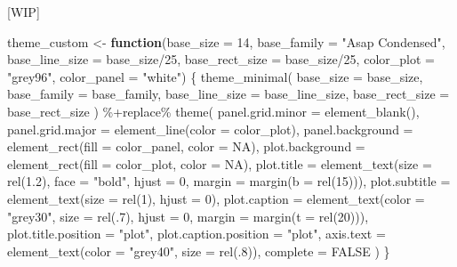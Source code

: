 \documentclass[
]{krantz}
\makeatletter
\newenvironment{Shaded}{\begin{snugshade}}{\end{snugshade}}
\newcommand{\AttributeTok}[1]{\textcolor[rgb]{0.61,0.61,0.61}{#1}}
\newcommand{\ConstantTok}[1]{\textcolor[rgb]{0,0,0}{#1}}
\newcommand{\ControlFlowTok}[1]{\textcolor[rgb]{0.27,0.27,0.27}{\textbf{#1}}}
\newcommand{\DecValTok}[1]{\textcolor[rgb]{0.06,0.06,0.06}{#1}}
\newcommand{\FloatTok}[1]{\textcolor[rgb]{0.06,0.06,0.06}{#1}}
\newcommand{\FunctionTok}[1]{\textcolor[rgb]{0,0,0}{#1}}
\newcommand{\NormalTok}[1]{#1}
\newcommand{\OtherTok}[1]{\textcolor[rgb]{0.37,0.37,0.37}{#1}}
\newcommand{\SpecialCharTok}[1]{\textcolor[rgb]{0,0,0}{#1}}
\newcommand{\StringTok}[1]{\textcolor[rgb]{0.5,0.5,0.5}{#1}}
\newenvironment{kframe}{%
\medskip{}
\setlength{\fboxsep}{.8em}
 \def\at@end@of@kframe{}%
 \ifinner\ifhmode%
  \def\at@end@of@kframe{\end{minipage}}%
  \begin{minipage}{\columnwidth}%
 \fi\fi%
 \def\FrameCommand##1{\hskip\@totalleftmargin \hskip-\fboxsep
 \colorbox{shadecolor}{##1}\hskip-\fboxsep
     \hskip-\linewidth \hskip-\@totalleftmargin \hskip\columnwidth}%
 \MakeFramed {\advance\hsize-\width
   \@totalleftmargin\z@ \linewidth\hsize
   \@setminipage}}%
 {\par\unskip\endMakeFramed%
 \at@end@of@kframe}
\renewenvironment{Shaded}{\begin{kframe}}{\end{kframe}}
\makeatother
\begin{document}
{[}WIP{]}

\begin{Shaded}
\begin{Highlighting}[]
\NormalTok{theme\_custom }\OtherTok{\textless{}{-}} \ControlFlowTok{function}\NormalTok{(}\AttributeTok{base\_size =} \DecValTok{14}\NormalTok{, }\AttributeTok{base\_family =} \StringTok{"Asap Condensed"}\NormalTok{, }
                         \AttributeTok{base\_line\_size =}\NormalTok{ base\_size}\SpecialCharTok{/}\DecValTok{25}\NormalTok{, }\AttributeTok{base\_rect\_size =}\NormalTok{ base\_size}\SpecialCharTok{/}\DecValTok{25}\NormalTok{,}
                         \AttributeTok{color\_plot =} \StringTok{"grey96"}\NormalTok{, }\AttributeTok{color\_panel =} \StringTok{"white"}\NormalTok{) \{}
    \FunctionTok{theme\_minimal}\NormalTok{(}
      \AttributeTok{base\_size =}\NormalTok{ base\_size, }\AttributeTok{base\_family =}\NormalTok{ base\_family, }
      \AttributeTok{base\_line\_size =}\NormalTok{ base\_line\_size, }\AttributeTok{base\_rect\_size =}\NormalTok{ base\_rect\_size}
\NormalTok{    ) }\SpecialCharTok{\%+replace\%} 
    \FunctionTok{theme}\NormalTok{(}
      \AttributeTok{panel.grid.minor =} \FunctionTok{element\_blank}\NormalTok{(),}
      \AttributeTok{panel.grid.major =} \FunctionTok{element\_line}\NormalTok{(}\AttributeTok{color =}\NormalTok{ color\_plot),}
      \AttributeTok{panel.background =} \FunctionTok{element\_rect}\NormalTok{(}\AttributeTok{fill =}\NormalTok{ color\_panel, }\AttributeTok{color =} \ConstantTok{NA}\NormalTok{),}
      \AttributeTok{plot.background =} \FunctionTok{element\_rect}\NormalTok{(}\AttributeTok{fill =}\NormalTok{ color\_plot, }\AttributeTok{color =} \ConstantTok{NA}\NormalTok{),}
      \AttributeTok{plot.title =} \FunctionTok{element\_text}\NormalTok{(}\AttributeTok{size =} \FunctionTok{rel}\NormalTok{(}\FloatTok{1.2}\NormalTok{), }\AttributeTok{face =} \StringTok{"bold"}\NormalTok{, }\AttributeTok{hjust =} \DecValTok{0}\NormalTok{,}
                                  \AttributeTok{margin =} \FunctionTok{margin}\NormalTok{(}\AttributeTok{b =} \FunctionTok{rel}\NormalTok{(}\DecValTok{15}\NormalTok{))), }
      \AttributeTok{plot.subtitle =} \FunctionTok{element\_text}\NormalTok{(}\AttributeTok{size =} \FunctionTok{rel}\NormalTok{(}\DecValTok{1}\NormalTok{), }\AttributeTok{hjust =} \DecValTok{0}\NormalTok{),}
      \AttributeTok{plot.caption =} \FunctionTok{element\_text}\NormalTok{(}\AttributeTok{color =} \StringTok{"grey30"}\NormalTok{, }\AttributeTok{size =} \FunctionTok{rel}\NormalTok{(.}\DecValTok{7}\NormalTok{), }\AttributeTok{hjust =} \DecValTok{0}\NormalTok{,}
                                  \AttributeTok{margin =} \FunctionTok{margin}\NormalTok{(}\AttributeTok{t =} \FunctionTok{rel}\NormalTok{(}\DecValTok{20}\NormalTok{))),}
      \AttributeTok{plot.title.position =} \StringTok{"plot"}\NormalTok{,}
      \AttributeTok{plot.caption.position =} \StringTok{"plot"}\NormalTok{,}
      \AttributeTok{axis.text =} \FunctionTok{element\_text}\NormalTok{(}\AttributeTok{color =} \StringTok{"grey40"}\NormalTok{, }\AttributeTok{size =} \FunctionTok{rel}\NormalTok{(.}\DecValTok{8}\NormalTok{)),}
      \AttributeTok{complete =} \ConstantTok{FALSE}
\NormalTok{  )}
\NormalTok{\}}
\end{Highlighting}
\end{Shaded}
\end{document}
